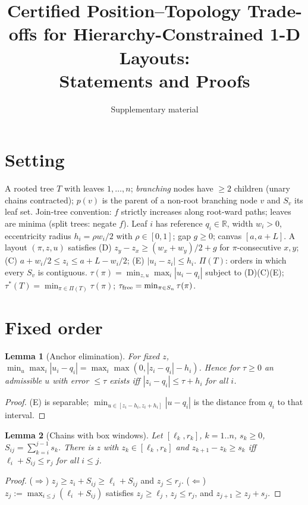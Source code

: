 \documentclass[11pt]{article}
\title{Certified Position--Topology Trade-offs for Hierarchy-Constrained 1-D Layouts:\\ Statements and Proofs}
\date{Supplementary material}
\newtheorem{lemma}{Lemma}\newtheorem{proposition}{Proposition}\newtheorem{theorem}{Theorem}\newtheorem{corollary}{Corollary}
\theoremstyle{remark}\newtheorem{remark}{Remark}
\begin{document}
\maketitle

\section*{Setting}
A rooted tree $T$ with leaves $1,\dots,n$; \emph{branching} nodes have $\ge 2$ children (unary chains contracted); $p(v)$ is the parent of a non-root branching node $v$ and $S_v$ its leaf set. Join-tree convention: $f$ strictly increases along root-ward paths; leaves are minima (split trees: negate $f$).
Leaf $i$ has reference $q_i\in\mathbb R$, width $w_i>0$, eccentricity radius $h_i=\rho w_i/2$ with $\rho\in[0,1]$; gap $g\ge 0$; canvas $[a,a+L]$.
A layout $(\pi,z,u)$ satisfies
(D) $z_y-z_x\ge (w_x+w_y)/2+g$ for $\pi$-consecutive $x,y$;
(C) $a+w_i/2\le z_i\le a+L-w_i/2$;
(E) $|u_i-z_i|\le h_i$.
$\Pi(T)$: orders in which every $S_v$ is contiguous.
$\tau(\pi)=\min_{z,u}\max_i|u_i-q_i|$ subject to (D)(C)(E); $\tau^*(T)=\min_{\pi\in\Pi(T)}\tau(\pi)$; $\tau_{\rm free}=\min_{\pi\in S_n}\tau(\pi)$.

\section{Fixed order}
\begin{lemma}[Anchor elimination]\label{lem:anchor}
For fixed $z$, $\min_u\max_i|u_i-q_i| = \max_i\max(0,|z_i-q_i|-h_i)$. Hence for $\tau\ge0$ an admissible $u$ with error $\le\tau$ exists iff $|z_i-q_i|\le\tau+h_i$ for all $i$.
\end{lemma}
\begin{proof}(E) is separable; $\min_{u\in[z_i-h_i,z_i+h_i]}|u-q_i|$ is the distance from $q_i$ to that interval.\end{proof}

\begin{lemma}[Chains with box windows]\label{lem:chain}
Let $[\ell_k,r_k]$, $k=1..n$, $s_k\ge0$, $S_{ij}=\sum_{k=i}^{j-1}s_k$. There is $z$ with $z_k\in[\ell_k,r_k]$ and $z_{k+1}-z_k\ge s_k$ iff $\ell_i+S_{ij}\le r_j$ for all $i\le j$.
\end{lemma}
\begin{proof}($\Rightarrow$) $z_j\ge z_i+S_{ij}\ge\ell_i+S_{ij}$ and $z_j\le r_j$. ($\Leftarrow$) $z_j:=\max_{i\le j}(\ell_i+S_{ij})$ satisfies $z_j\ge\ell_j$, $z_j\le r_j$, and $z_{j+1}\ge z_j+s_j$.\end{proof}
\end{document}
